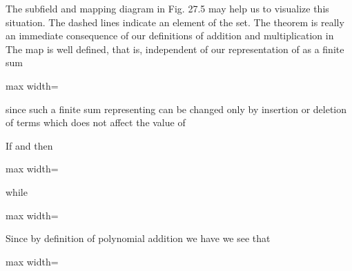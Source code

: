 \documentclass[11pt,oneside]{article}
\begin{document}
\begin{BookBody}
 The subfield and mapping diagram in Fig. 27.5 may help us to visualize this situation. The dashed lines indicate an element of the set. The theorem is really an immediate consequence of our definitions of addition and multiplication in  The map \BookInline{\phi _{\alpha }} is well defined, that is, independent of our representation of  as a finite sum

\begin{center}\begin{adjustbox}{max width=\linewidth}\end{adjustbox}\end{center}

\noindent since such a finite sum representing  can be changed only by insertion or deletion of terms  which does not affect the value of 

If  and   then

\begin{center}\begin{adjustbox}{max width=\linewidth}\end{adjustbox}\end{center}

\noindent while

\begin{center}\begin{adjustbox}{max width=\linewidth}\end{adjustbox}\end{center}

\noindent Since by definition of polynomial addition we have  we see that

\begin{center}\begin{adjustbox}{max width=\linewidth}\end{adjustbox}\end{center}


\end{BookBody}
\end{document}
